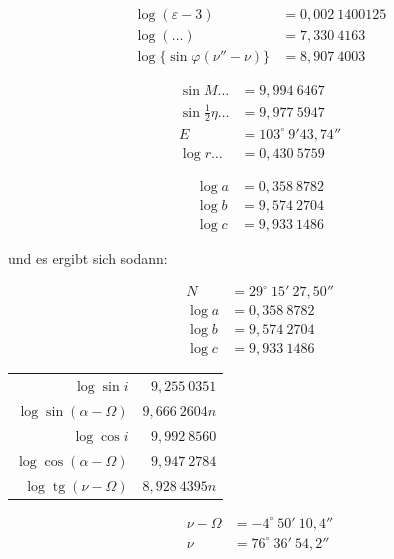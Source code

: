 \documentclass[12pt,a4paper]{article}
\DeclareMathOperator{\tg}{tg}
\theoremstyle{plain}
\theoremstyle{definition}
\theoremstyle{remark}
\begin{document}
\newpage

\begin{align*}
\log(\varepsilon - 3) &= 0{,}002\ 1400125 \\
\log(\dots) &= 7{,}330\ 4163 \\
\log\{\sin\varphi(\nu'' - \nu)\} &= 8{,}907\ 4003
\end{align*}

\begin{align*}
\sin M\dots &= 9{,}994\ 6467 \\
\sin\tfrac{1}{2}\eta\dots &= 9{,}977\ 5947 \\
E &= 103^\circ\ 9'43{,}74'' \\
\log r\dots &= 0{,}430\ 5759
\end{align*}

\newpage

\begin{align*}
\log a &= 0{,}358\ 8782 \\
\log b &= 9{,}574\ 2704 \\
\log c &= 9{,}933\ 1486
\end{align*}

und es ergibt sich sodann:

\begin{align*}
N &= 29^\circ\ 15'\ 27{,}50'' \\
\log a &= 0{,}358\ 8782 \\
\log b &= 9{,}574\ 2704 \\
\log c &= 9{,}933\ 1486
\end{align*}

\newpage

\begin{center}
\begin{tabular}{r@{\quad}r}
$\log \sin i$ & $9{,}255\ 0351$ \\
$\log \sin(\alpha - \Omega)$ & $9{,}666\ 2604n$ \\
$\log \cos i$ & $9{,}992\ 8560$ \\
$\log \cos(\alpha - \Omega)$ & $9{,}947\ 2784$ \\
$\log \tg(\nu - \Omega)$ & $8{,}928\ 4395n$
\end{tabular}
\end{center}

\begin{align*}
\nu - \Omega &= -4^\circ\ 50'\ 10{,}4'' \\
\nu &= 76^\circ\ 36'\ 54{,}2''
\end{align*}
\end{document}
